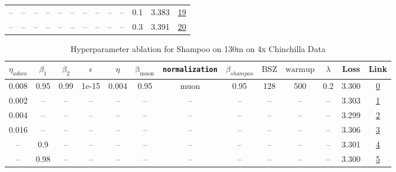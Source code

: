 \begin{table}[H]
\begin{tabular}{ccccccccccccc}
-- & -- & -- & -- & -- & -- & -- & -- & -- & -- & 0.1 & 3.383 & \href{https://wandb.ai/stanford-mercury/optimizer-scaling/runs/sweep-130m-5B-mudamhab74f2lr0.008-alr0.008-wd0.1-minlr0-warmup50-0efdac}{19} \\
-- & -- & -- & -- & -- & -- & -- & -- & -- & -- & 0.3 & 3.391 & \href{https://wandb.ai/stanford-mercury/optimizer-scaling/runs/sweep-130m-5B-mudamhfa2f5clr0.008-alr0.008-wd0.3-minlr0-warmup50-8632db}{20} \\
\bottomrule
\end{tabular}
\end{table}

\begin{table}[H]
\centering
\caption{Hyperparameter ablation for Shampoo on 130m on 4x Chinchilla Data}
\label{tab:ablation_shampoo_130m_4}
\begin{tabular}{ccccccccccccc}
\toprule
$\eta_{adam}$ & $\beta_1$ & $\beta_2$ & $\epsilon$ & $\eta$ & $\mathrm{\beta_{muon}}$ & \texttt{normalization} & $\beta_{shampoo}$ & $\mathrm{BSZ}$ & $\mathrm{warmup}$ & $\lambda$ & Loss & Link \\
\midrule
0.008 & 0.95 & 0.99 & 1e-15 & 0.004 & 0.95 & muon & 0.95 & 128 & 500 & 0.2 & 3.300 & \href{https://wandb.ai/stanford-mercury/optimizer-scaling/runs/sweep-130m-10B-mudamhcf2e65lr0.004-alr0.008-wd0.2-minlr0-warmup5-8614e7}{0} \\
\midrule
0.002 & -- & -- & -- & -- & -- & -- & -- & -- & -- & -- & 3.303 & \href{https://wandb.ai/stanford-mercury/optimizer-scaling/runs/sweep-130m-10B-mudamhf80736lr0.004-alr0.002-wd0.2-minlr0-warmup5-19fa6b}{1} \\
0.004 & -- & -- & -- & -- & -- & -- & -- & -- & -- & -- & 3.299 & \href{https://wandb.ai/stanford-mercury/optimizer-scaling/runs/sweep-130m-10B-mudamha5bf40lr0.004-alr0.004-wd0.2-minlr0-warmup5-cf5259}{2} \\
0.016 & -- & -- & -- & -- & -- & -- & -- & -- & -- & -- & 3.306 & \href{https://wandb.ai/stanford-mercury/optimizer-scaling/runs/sweep-130m-10B-mudamhe8a62alr0.004-alr0.016-wd0.2-minlr0-warmup5-4635fb}{3} \\
-- & 0.9 & -- & -- & -- & -- & -- & -- & -- & -- & -- & 3.301 & \href{https://wandb.ai/stanford-mercury/optimizer-scaling/runs/sweep-130m-10B-mudamh2078c7lr0.004-alr0.008-wd0.2-minlr0-warmup5-7d345f}{4} \\
-- & 0.98 & -- & -- & -- & -- & -- & -- & -- & -- & -- & 3.300 & \href{https://wandb.ai/stanford-mercury/optimizer-scaling/runs/sweep-130m-10B-mudamha5a170lr0.004-alr0.008-wd0.2-minlr0-warmup5-e1af40}{5} \\

\end{tabular}
\end{table}

